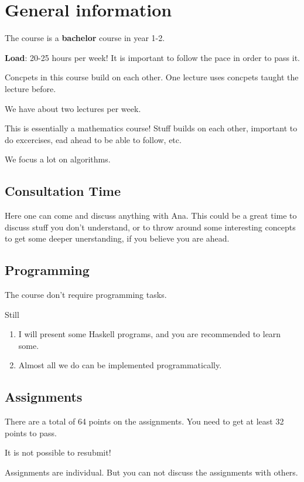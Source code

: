 \documentclass{article}
\begin{document}
\section{General information}

The course is a \textbf{bachelor} course in year 1-2.

\textbf{Load}: 20-25 hours per week! It is important to follow the pace in order to pass it.

Concpets in this course build on each other. One lecture uses concpets taught the lecture before.

We have about two lectures per week.

This is essentially a mathematics course! Stuff builds on each other, important to do excercises, ead ahead to be able to follow, etc.

We focus a lot on algorithms.

\subsection{Consultation Time}

Here one can come and discuss anything with Ana. This could be a great time to discuss stuff you don't understand, or to throw around some interesting concepts to get some deeper unerstanding, if you believe you are ahead.

\subsection{Programming}

The course don't require programming tasks.

Still
\begin{enumerate}
    \item I will present some Haskell programs, and you are recommended to learn some.
    \item Almost all we do can be implemented programmatically.
\end{enumerate}

\subsection{Assignments}

There are a total of 64 points on the assignments. You need to get at least 32 points to pass.

It is not possible to resubmit!

Assignments are individual. But you can not discuss the assignments with others.
\end{document}
